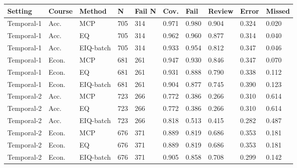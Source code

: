 \begin{tabular}{llllllllll}
\toprule
Setting & Course & Method & N & Fail N & Cov. & Fail & Review & Error & Missed\\
\midrule
Temporal-1 & Acc. & MCP & 705 & 314 & 0.971 & 0.980 & 0.904 & 0.324 & 0.020\\
Temporal-1 & Acc. & EQ & 705 & 314 & 0.962 & 0.960 & 0.877 & 0.314 & 0.040\\
Temporal-1 & Acc. & EIQ-batch & 705 & 314 & 0.933 & 0.954 & 0.812 & 0.347 & 0.046\\
Temporal-1 & Econ. & MCP & 681 & 261 & 0.947 & 0.930 & 0.846 & 0.347 & 0.070\\
Temporal-1 & Econ. & EQ & 681 & 261 & 0.931 & 0.888 & 0.790 & 0.338 & 0.112\\
Temporal-1 & Econ. & EIQ-batch & 681 & 261 & 0.904 & 0.877 & 0.745 & 0.390 & 0.123\\
Temporal-2 & Acc. & MCP & 723 & 266 & 0.772 & 0.386 & 0.266 & 0.310 & 0.614\\
Temporal-2 & Acc. & EQ & 723 & 266 & 0.772 & 0.386 & 0.266 & 0.310 & 0.614\\
Temporal-2 & Acc. & EIQ-batch & 723 & 266 & 0.818 & 0.513 & 0.415 & 0.282 & 0.487\\
Temporal-2 & Econ. & MCP & 676 & 371 & 0.889 & 0.819 & 0.686 & 0.353 & 0.181\\
Temporal-2 & Econ. & EQ & 676 & 371 & 0.889 & 0.819 & 0.686 & 0.353 & 0.181\\
Temporal-2 & Econ. & EIQ-batch & 676 & 371 & 0.905 & 0.858 & 0.708 & 0.299 & 0.142\\
\bottomrule
\end{tabular}